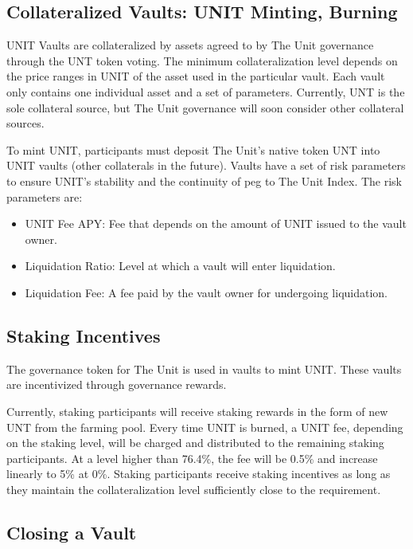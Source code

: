 \documentclass[12pt]{article}
\begin{document}
\subsection{Collateralized Vaults: UNIT Minting, Burning}



UNIT Vaults are collateralized by assets agreed to by The Unit governance through the UNT token voting. The minimum collateralization level depends on the price ranges in UNIT of the asset used in the particular vault. Each vault only contains one individual asset and a set of parameters. Currently, UNT is the sole collateral source, but The Unit governance will soon consider other collateral sources.

To mint UNIT, participants must deposit The Unit’s native token UNT into UNIT vaults (other collaterals in the future). Vaults have a set of risk parameters to ensure UNIT's stability and the continuity of peg to The Unit Index. The risk parameters are:

\begin{itemize}
\item UNIT Fee APY: Fee that depends on the amount of UNIT issued to the vault owner.
\item Liquidation Ratio: Level at which a vault will enter liquidation.
\item Liquidation Fee: A fee paid by the vault owner for undergoing liquidation.
\end{itemize}


\subsection{Staking Incentives}

The governance token for The Unit is used in vaults to mint UNIT. These vaults are incentivized through governance rewards.

Currently, staking participants will receive staking rewards in the form of new UNT from the farming pool. Every time UNIT is burned, a UNIT fee, depending on the staking level, will be charged and distributed to the remaining staking participants. At a level higher than 76.4\%, the fee will be 0.5\% and increase linearly to 5\% at 0\%. Staking participants receive staking incentives as long as they maintain the collateralization level sufficiently close to the requirement.


\subsection{Closing a Vault}
\end{document}
